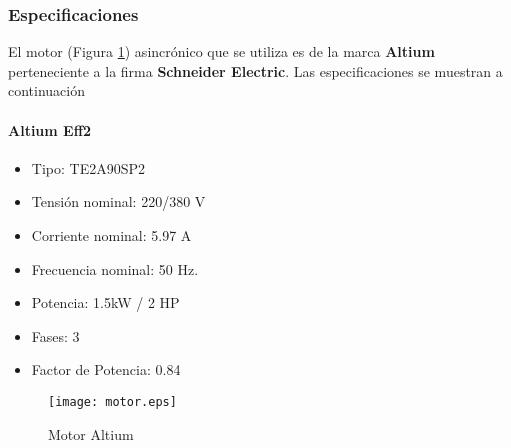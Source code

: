 \subsubsection{Especificaciones}

	El motor (Figura \ref{fig:motor}) asincrónico que se utiliza es de la marca \textbf{Altium} perteneciente a la firma \textbf{Schneider Electric}. Las especificaciones se muestran a continuación \\
	\paragraph*{Altium Eff2}
	\begin{itemize}
		\item 	Tipo: TE2A90SP2
		\item   Tensión nominal: 220/380 V
		\item 	Corriente nominal: 5.97 A 
		\item	Frecuencia nominal:  50 Hz.
		\item 	Potencia: 1.5kW / 2 HP
		\item 	Fases: 3
		\item   Factor de Potencia: 0.84
	\end{itemize}
	\newpage
	\begin{figure}[h!]
		\centering
		\texttt{[image: motor.eps]}
		\caption{Motor Altium}
		\label{fig:motor}
	\end{figure}
	\newpage